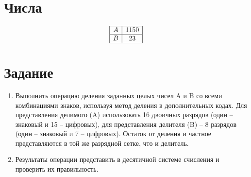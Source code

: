 \documentclass{article}
\begin{document}
\itmo[
       variant=111,
       labn=5,
       worktype=Домашняя работа,
       discipline=Дискретная математика,
       group=P3115,
       student=Владимир Мацюк,
       teacher=Поляков Владимир Иванович,
       logo=../../../lib/img/itmo.png
]

\newcommand{\car}{\multicolumn{1}{c@{\hspace*{\tabcolsep}\makebox[0pt]{\curvearrowleft}}}{}}
\newcommand{\rcar}{\multicolumn{1}{c@{\hspace*{\tabcolsep}\makebox[0pt]{\curvearrowright}}}{}}
\newcommand{\ncar}{\multicolumn{1}{c@{\hspace*{\tabcolsep}\makebox[0pt]{}}}{}}
\newcommand{\SPACE}{\multicolumn{12}{c}{}}
\newcommand{\INT}{\multicolumn{5}{c}{\MM{Интерпретации}}}
\newcommand{\PLUS}{\multirow{2}{*}{+}}
\newcommand{\MINUS}{\multirow{2}{*}{-}}
\newcommand{\SIGN}{\multicolumn{2}{c}{\MM{Знаковая}}}
\newcommand{\USIGN}{\multicolumn{2}{c}{\MM{Беззнаковая}}}

\section{Числа}
$$
       \begin{array}{|c|c|}
              \hline
              A & 1150 \\\hline
              B & 23 \\\hline
       \end{array}
$$
\section{Задание}

\begin{center}

       \begin{enumerate}
              \begin{enumerate}
                     \item Выполнить операцию деления заданных целых чисел A и B со всеми комбинациями знаков, используя метод деления в дополнительных кодах. Для представления делимого (A) использовать 16 двоичных разрядов (один –знаковый и 15 – цифровых), для представления делителя (B) – 8 разрядов (один – знаковый и 7 – цифровых). Остаток от деления и частное представляются в той же разрядной сетке, что и делитель.
                     \item Результаты операции представить в десятичной системе счисления и проверить их правильность.
              \end{enumerate}
                    
       \end{enumerate}
\end{center}
\end{document}
